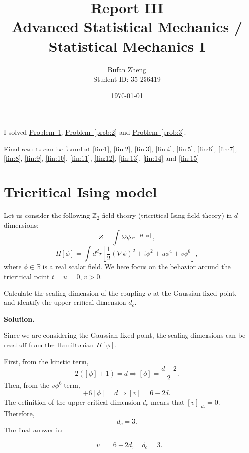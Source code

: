 \documentclass[11pt,a4paper]{article}
\title{\textbf{Report III}\\[0.4em]
	\large Advanced Statistical Mechanics / Statistical Mechanics I}
\author{Bufan Zheng\\[0.2em]\normalsize Student ID: 35-256419}
\date{\today}
\newcounter{problem}
\newcounter{saveequation}
\newenvironment{solution}
{
	\par
	\setcounter{saveequation}{\value{equation}}
	\begingroup
	\setcounter{equation}{0}
	\renewcommand{\theequation}{\arabic{problem}.\arabic{equation}}
	\renewcommand{\theHequation}{sol.\arabic{problem}.\arabic{equation}}
	\noindent\textbf{Solution.}\quad
}
{
	\par
	\endgroup
	\setcounter{equation}{\value{saveequation}}
}
\begin{document}
	\maketitle
	
	I solved \hyperref[prob:1]{Problem~\ref*{prob:1}}, \hyperref[prob:2]{Problem~\ref*{prob:2}} and \hyperref[prob:3]{Problem~\ref*{prob:3}}.
	
	Final results can be found at \ref{fin:1}, \ref{fin:2}, \ref{fin:3}, \ref{fin:4}, \ref{fin:5}, \ref{fin:6}, \ref{fin:7}, \ref{fin:8}, \ref{fin:9}, \ref{fin:10}, \ref{fin:11}, \ref{fin:12}, \ref{fin:13}, \ref{fin:14} and \ref{fin:15}

	\section{Tricritical Ising model}
	\label{prob:1}

	Let us consider the following $\mathbb{Z}_2$ field theory (tricritical Ising field theory) in $d$ dimensions:
	\begin{equation}
		Z=\int \mathcal{D}\phi\,e^{-H[\phi]},
	\end{equation}
	\begin{equation}
		H[\phi]=\int d^d r\left[\frac{1}{2}(\nabla\phi)^2+t\phi^2+u\phi^4+v\phi^6\right],
	\end{equation}
	where $\phi\in\mathbb{R}$ is a real scalar field. We here focus on the behavior around the tricritical point $t=u=0$, $v>0$.

	\begin{problembox}
		Calculate the scaling dimension of the coupling $v$ at the Gaussian fixed point, and identify the upper critical dimension $d_c$.
	\end{problembox}
\begin{solution}
	Since we are considering the Gaussian fixed point, the scaling dimensions can be read off from the Hamiltonian $H[\phi]$.
	
	First, from the kinetic term,
	\begin{equation}
		2([\phi]+1)=d\Rightarrow [\phi]=\frac{d-2}{2}.
	\end{equation}
	Then, from the $v\phi^6$ term,
	\begin{equation}
		[v]+6[\phi]=d\Rightarrow \boxed{[v]=6-2d}.
	\end{equation}
	The definition of the upper critical dimension $d_c$ means that $\left.[v]\right|_{d_c}=0$. Therefore,
	\begin{equation}
		\boxed{d_c=3}.
	\end{equation}
	The final answer is:
	\begin{finalanswer}
		\begin{equation}
			\label{fin:1}
			[v]=6-2d,\quad d_c=3.
		\end{equation}
	\end{finalanswer}
\end{solution}
\end{document}
